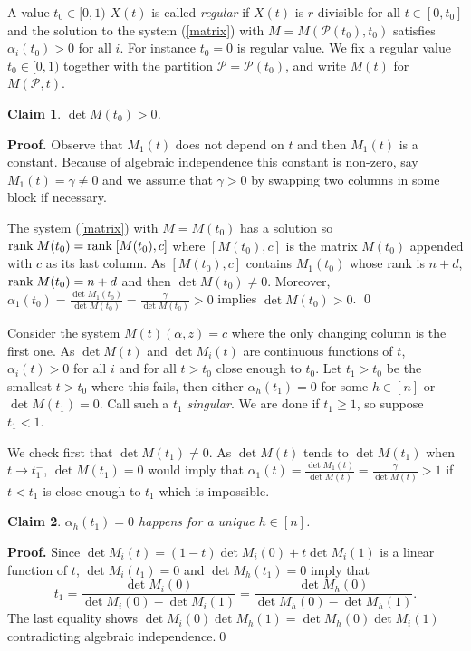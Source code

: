 \documentclass[12pt,a4paper]{amsart}
\newtheorem{claim}{Claim}[section]
\newcommand{\al}{\alpha}
\newcommand{\p}{\mathcal{P}}
\newcommand{\rank}{\textrm{rank\;}}
\numberwithin{equation}{section}
\begin{document}
\smallskip
A value $t_0 \in [0,1)$ $X(t)$ is called {\sl regular} if $X(t)$ is $r$-divisible for all $t\in [0,t_0]$ and the solution to the system (\ref{matrix}) with $M=M(\p(t_0),t_0)$ satisfies $\al_i(t_0)>0$ for all $i.$ For instance $t_0=0$ is regular value. We fix a regular value $t_0\in [0,1)$ together with the partition $\p=\p(t_0)$, and write $M(t)$ for $M(\p,t)$.

\begin{claim}\label{cl:det} $\det M(t_0) > 0$.
\end{claim}

{\bf Proof.} Observe that $M_1(t)$ does not depend on $t$ and then $M_1(t)$ is a constant. Because of algebraic independence this constant is non-zero, say $M_1(t)=\gamma\ne 0$ and we assume that $\gamma>0$ by swapping two columns in some block if necessary.

\smallskip
The system (\ref{matrix}) with $M=M(t_0)$ has a solution so $\rank M(t_0)= \rank [M(t_0),c]$ where $[M(t_0),c]$  is the matrix $M(t_0)$ appended with $c$ as its last column. As $[M(t_0),c]$ contains $M_1(t_0)$ whose rank is $n+d$, $\rank M(t_0)=n+d$ and then $\det M(t_0)\ne 0$. Moreover, $\al_1(t_0)=\frac {\det M_1(t_0)}{\det M(t_0)}=\frac {\gamma}{\det M(t_0)}>0$ implies $\det M(t_0)>0$. \qed

\smallskip
Consider the system $M(t)(\al,z)=c$ where the only changing column is the first one. As $\det M(t)$ and $\det M_i(t)$ are continuous functions of $t$, $\al_i(t)>0$ for all $i$ and for all $t>t_0$ close enough to $t_0$. Let $t_1>t_0$ be the smallest $t>t_0$ where this fails, then either $\al_h(t_1)=0$ for some $h \in [n]$ or $\det M(t_1)=0$. Call such a $t_1$ {\sl singular}. We are done if $t_1\ge 1$, so suppose $t_1<1.$

\smallskip
We check first that $\det M(t_1)\ne 0$. As $\det M(t)$ tends to $\det M(t_1)$ when $t \to t_1^-$, $\det M(t_1)=0$ would imply that $\al_1(t)=\frac {\det M_1(t)}{\det M(t)}=\frac {\gamma}{\det M(t)}>1$ if $t<t_1$ is close enough to $t_1$ which is impossible.

\begin{claim}\label{cl:huniq} $\al_h(t_1)=0$ happens for a unique $h \in [n]$.
\end{claim}

{\bf Proof.} Since $\det M_i(t)=(1-t)\det M_i(0)+t\det M_i(1)$ is a linear function of $t$, $\det M_i(t_1)=0$ and $\det M_h(t_1)=0$ imply that
\[
t_1= \frac {\det M_i(0)}{\det M_i(0)-\det M_i(1)}=\frac {\det M_h(0)}{\det M_h(0)-\det M_h(1)}.
\]
The last equality shows $\det M_i(0)\det M_h(1)=\det M_h(0)\det M_i(1)$ contradicting algebraic independence.\qed
\end{document}
